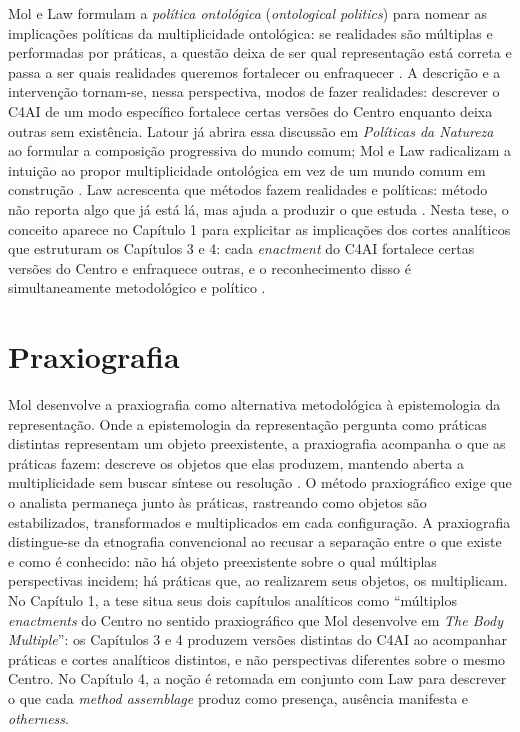 \begin{description}
Mol e Law formulam a \textit{política ontológica} (\textit{ontological politics}) para nomear as implicações políticas da multiplicidade ontológica: se realidades são múltiplas e performadas por práticas, a questão deixa de ser qual representação está correta e passa a ser quais realidades queremos fortalecer ou enfraquecer \parencite[pp.~74--75]{mol1999ontological}. A descrição e a intervenção tornam-se, nessa perspectiva, modos de fazer realidades: descrever o C4AI de um modo específico fortalece certas versões do Centro enquanto deixa outras sem existência. Latour já abrira essa discussão em \textit{Políticas da Natureza} ao formular a composição progressiva do mundo comum; Mol e Law radicalizam a intuição ao propor multiplicidade ontológica em vez de um mundo comum em construção \parencite{latour2004politics,Law2004After}. Law acrescenta que métodos fazem realidades e políticas: método não reporta algo que já está lá, mas ajuda a produzir o que estuda \parencite[p.~143]{Law2004After}. Nesta tese, o conceito aparece no Capítulo 1 para explicitar as implicações dos cortes analíticos que estruturam os Capítulos 3 e 4: cada \textit{enactment} do C4AI fortalece certas versões do Centro e enfraquece outras, e o reconhecimento disso é simultaneamente metodológico e político \parencite{mol1999ontological,Law2004After}.

\bigskip

\section*{Praxiografia}

Mol desenvolve a praxiografia como alternativa metodológica à epistemologia da representação. Onde a epistemologia da representação pergunta como práticas distintas representam um objeto preexistente, a praxiografia acompanha o que as práticas fazem: descreve os objetos que elas produzem, mantendo aberta a multiplicidade sem buscar síntese ou resolução \parencite{mol2002body}. O método praxiográfico exige que o analista permaneça junto às práticas, rastreando como objetos são estabilizados, transformados e multiplicados em cada configuração. A praxiografia distingue-se da etnografia convencional ao recusar a separação entre o que existe e como é conhecido: não há objeto preexistente sobre o qual múltiplas perspectivas incidem; há práticas que, ao realizarem seus objetos, os multiplicam. No Capítulo 1, a tese situa seus dois capítulos analíticos como ``múltiplos \textit{enactments} do Centro no sentido praxiográfico que Mol desenvolve em \textit{The Body Multiple}'': os Capítulos 3 e 4 produzem versões distintas do C4AI ao acompanhar práticas e cortes analíticos distintos, e não perspectivas diferentes sobre o mesmo Centro. No Capítulo 4, a noção é retomada em conjunto com Law \parencite{MolLaw1994} para descrever o que cada \textit{method assemblage} produz como presença, ausência manifesta e \textit{otherness}.


\end{description}
